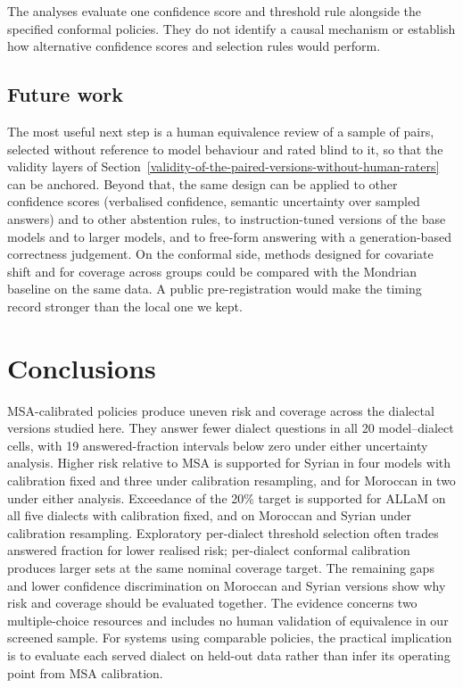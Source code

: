 \documentclass[applsci,article,submit,pdftex,oneauthor]{Definitions/mdpi}
\begin{document}
The analyses evaluate one confidence score and threshold rule alongside the specified conformal policies. They do not identify a causal mechanism or establish how alternative confidence scores and selection rules would perform.

\hypertarget{future-work}{%
\subsection{Future work}\label{future-work}}

The most useful next step is a human equivalence review of a sample of pairs, selected without reference to model behaviour and rated blind to it, so that the validity layers of Section~\ref{validity-of-the-paired-versions-without-human-raters} can be anchored. Beyond that, the same design can be applied to other confidence scores (verbalised confidence, semantic uncertainty over sampled answers) and to other abstention rules, to instruction-tuned versions of the base models and to larger models, and to free-form answering with a generation-based correctness judgement. On the conformal side, methods designed for covariate shift and for coverage across groups could be compared with the Mondrian baseline on the same data. A public pre-registration would make the timing record stronger than the local one we kept.

\hypertarget{conclusions}{%
\section{Conclusions}\label{conclusions}}

MSA-calibrated policies produce uneven risk and coverage across the dialectal versions studied here. They answer fewer dialect questions in all 20 model--dialect cells, with 19 answered-fraction intervals below zero under either uncertainty analysis. Higher risk relative to MSA is supported for Syrian in four models with calibration fixed and three under calibration resampling, and for Moroccan in two under either analysis. Exceedance of the 20\% target is supported for ALLaM on all five dialects with calibration fixed, and on Moroccan and Syrian under calibration resampling. Exploratory per-dialect threshold selection often trades answered fraction for lower realised risk; per-dialect conformal calibration produces larger sets at the same nominal coverage target. The remaining gaps and lower confidence discrimination on Moroccan and Syrian versions show why risk and coverage should be evaluated together. The evidence concerns two multiple-choice resources and includes no human validation of equivalence in our screened sample. For systems using comparable policies, the practical implication is to evaluate each served dialect on held-out data rather than infer its operating point from MSA calibration.
\end{document}
